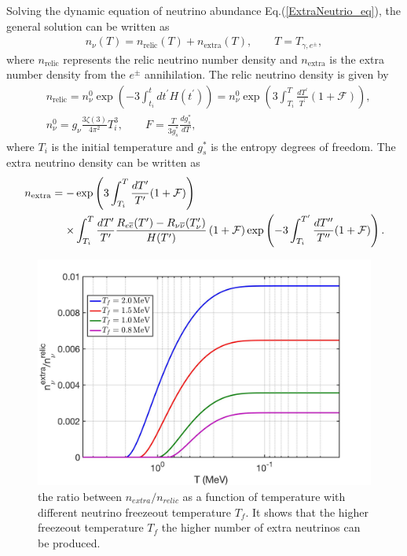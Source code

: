 Solving the dynamic equation of neutrino abundance Eq.(\ref{ExtraNeutrio_eq}), the general solution can be written as
\begin{align}
n_\nu(T)=n_\mathrm{relic}(T)+n_\mathrm{extra}(T),\qquad T=T_{\gamma,e^\pm},
\end{align}
where $n_\mathrm{relic}$ represents the relic neutrino number density and $n_\mathrm{extra}$ is the extra number density from the $e^\pm$ annihilation. The relic neutrino density is given by
\begin{align}  &n_\mathrm{relic}=n_\nu^0\exp\left(-3\int_{t_i}^t{dt^\prime}H(t^\prime)\right)=n_\nu^0\exp\left(3\int_{T_i}^T\frac{dT^\prime}{T^\prime}(1+\mathcal{F})\right),\\
&n^0_\nu=g_\nu\frac{3\zeta(3)}{4\pi^2}T^3_i,\qquad F=\frac{T}{3g^\ast_s}\frac{dg^\ast_s}{dT},
\end{align}
where $T_i$ is the initial temperature and $g^\ast_s$ is the entropy degrees of freedom. The extra neutrino density can be written as
\begin{align}
n_\mathrm{extra}=-&\exp\left(3\int_{T_i}^T\frac{dT^\prime}{T^\prime}(1+\mathcal{F})\right)\notag\\
\times&\int_{T_i}^T\frac{dT^\prime}{T^\prime}\frac{R_{e\overline{e}}(T^\prime)-R_{\nu\overline{\nu}}(T^\prime_\nu)}{H(T^\prime)}\left(1+\mathcal{F}\right)\exp\left(-3\int_{T_i}^{T^{\prime}}\frac{dT^{\prime\prime}}{T^{\prime\prime}}(1+\mathcal{F})\right).
\end{align}
\begin{figure}[ht]
\begin{center}
\includegraphics[width=\textwidth]{./plots/ExtraNeutrinoRatio}
\caption{the ratio between $n_{extra}/n_{relic}$ as a function of temperature with different neutrino freezeout temperature $T_f$. It shows that the higher freezeout temperature $T_f$ the higher number of extra neutrinos can be produced.}
\label{ExtraNeutrinoRatio}
\end{center}
\end{figure}

